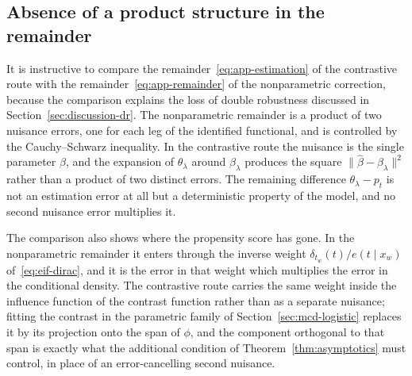\documentclass[11pt]{article}
\theoremstyle{plain}
\theoremstyle{definition}
\theoremstyle{remark}
\newcommand{\betahat}{\widehat{\beta}}
\newcommand{\gps}{e}
\begin{document}
\subsection{Absence of a product structure in the remainder}
\label{app:asymptotics-dr}

It is instructive to compare the remainder~\eqref{eq:app-estimation} of the contrastive route
with the remainder~\eqref{eq:app-remainder} of the nonparametric correction, because the
comparison explains the loss of double robustness discussed in Section~\ref{sec:discussion-dr}.
The nonparametric remainder is a product of two nuisance errors, one for each leg of the
identified functional, and is controlled by the Cauchy--Schwarz inequality. In the contrastive
route the nuisance is the single parameter $\beta$, and the expansion of $\theta_\lambda$ around
$\beta_\lambda$ produces the square $\|\betahat - \beta_\lambda\|^2$ rather than a product of two
distinct errors. The remaining difference $\theta_\lambda - p_t$ is not an estimation error at
all but a deterministic property of the model, and no second nuisance error multiplies it.

The comparison also shows where the propensity score has gone. In the nonparametric remainder it
enters through the inverse weight $\delta_{t_w}(t)/\gps(t \mid x_w)$ of~\eqref{eq:eif-dirac}, and
it is the error in that weight which multiplies the error in the conditional density. The
contrastive route carries the same weight inside the influence function of the contrast function
rather than as a separate nuisance; fitting the contrast in the parametric family of
Section~\ref{sec:mcd-logistic} replaces it by its projection onto the span of $\phi$, and the
component orthogonal to that span is exactly what the additional condition of
Theorem~\ref{thm:asymptotics} must control, in place of an error-cancelling second nuisance.
\end{document}
